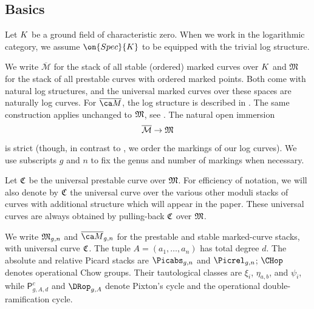 \subsection{Basics}\label{sec:prestable_vs_log_curves}

Let ${K}$ be a ground field of characteristic zero. When we work in the logarithmic category, we assume $\on{Spec} {\field}$ to be equipped with the trivial log structure.

We write $\overline{\mathcal M}$ for the stack of all stable (ordered) marked curves over ${K}$
and $\mathfrak M$ for the stack of all prestable curves with ordered marked points. Both come with natural log structures, and the universal marked curves over these spaces are naturally log curves.
For $\Mbar$, the log structure is described in \cite{Kato2000Log-smooth-defo}.
The same construction applies unchanged to $\frak M$, see
\cite[Appendix A]{Gross2013Logarithmic-Gro}.
The natural open immersion $$\overline{\mathcal M} \to \frak M$$ is strict (though, in contrast to  \cite{Gross2013Logarithmic-Gro,Kato2000Log-smooth-defo},
we order the markings of our log curves). We use subscripts $g$ and $n$ to fix the genus and number of markings when necessary.

Let $\frak C$ be
the universal prestable curve over $\frak M$.
For efficiency of notation, we will also denote by $\frak C$ the universal curve over the various other moduli stacks
of curves with additional structure which
will appear in the paper.
These universal curves are always obtained by
pulling-back $\frak C$ over $\frak M$.


\begin{remark}
\label{default}
We write $\frak M_{g,n}$ and $\Mbar_{g,n}$ for the prestable and stable
marked-curve stacks, with universal curve $\frak C$.  The tuple
$A=(a_1,\ldots,a_n)$ has total degree $d$.  The absolute and relative Picard
stacks are $\Picabs_{g,n}$ and $\Picrel_{g,n}$; $\CHop$ denotes operational
Chow groups.  Their tautological classes are $\xi_i$, $\eta_{a,b}$, and
$\psi_i$, while $\mathsf P_{g,A,d}^{c}$ and $\DRop_{g,A}$ denote Pixton's
cycle and the operational double-ramification cycle.
\end{remark}

